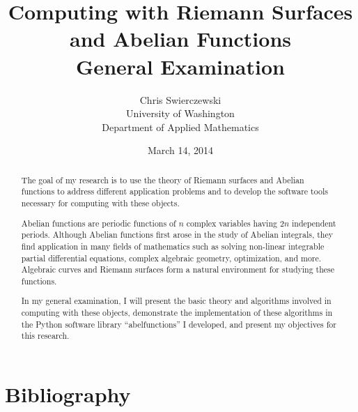 \documentclass[12pt,twoside]{article}
\title{Computing with Riemann Surfaces and Abelian Functions \\ {\small
    General Examination}}
\author{
Chris Swierczewski\\
University of Washington\\
Department of Applied Mathematics}
\date{March 14, 2014}
\theoremstyle{plain}
\theoremstyle{definition}
\numberwithin{equation}{section}
\numberwithin{figure}{section}
\begin{document}

\maketitle

\begin{abstract}
The goal of my research is to use the theory of Riemann surfaces and
Abelian functions to address different application problems and to
develop the software tools necessary for computing with these objects.

Abelian functions are periodic functions of $n$ complex variables having
$2n$ independent periods. Although Abelian functions first arose in the
study of Abelian integrals, they find application in many fields of
mathematics such as solving non-linear integrable partial differential
equations, complex algebraic geometry, optimization, and more. Algebraic
curves and Riemann surfaces form a natural environment for studying
these functions.

In my general examination, I will present the basic theory and
algorithms involved in computing with these objects, demonstrate the
implementation of these algorithms in the Python software library
``abelfunctions'' I developed, and present my objectives for this
research.
\end{abstract}

%

%
%

\section{Bibliography}






\end{document}
